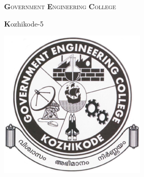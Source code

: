 %
%
%
% 
% 
% 
%
\thispagestyle{empty}

\begin{center}\vspace{20 mm}
  \textsc{{\huge  \textbf{G}overnment \textbf{E}ngineering
      \textbf{C}ollege}}\newline\newline
\end{center}

\begin{center}
  {\huge  \textbf{K}ozhikode-5}
\end{center}

\newline

\begin{center}
  \includegraphics[scale=1.3]{src/images/geck}
\end{center}

\newline


